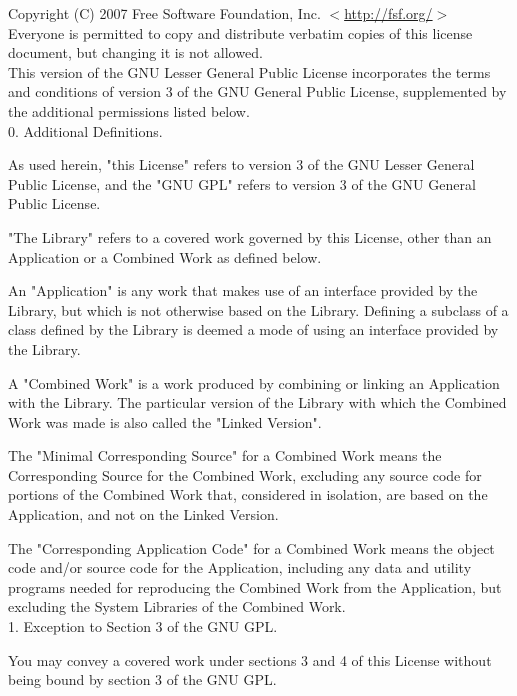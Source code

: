 \noindent Copyright (C) 2007 Free Software Foundation, Inc.  $<$\href{http://fsf.org/}{http://fsf.org/}$>$ \\

\noindent Everyone is permitted to copy and distribute verbatim copies
of this license document, but changing it is not allowed. \\


This version of the GNU Lesser General Public License incorporates
the terms and conditions of version 3 of the GNU General Public
License, supplemented by the additional permissions listed below. \\

0. Additional Definitions.

As used herein, "this License" refers to version 3 of the GNU Lesser
General Public License, and the "GNU GPL" refers to version 3 of the GNU
General Public License.

"The Library" refers to a covered work governed by this License,
other than an Application or a Combined Work as defined below.

An "Application" is any work that makes use of an interface provided
by the Library, but which is not otherwise based on the Library.
Defining a subclass of a class defined by the Library is deemed a mode
of using an interface provided by the Library.

A "Combined Work" is a work produced by combining or linking an
Application with the Library.  The particular version of the Library
with which the Combined Work was made is also called the "Linked
Version".

The "Minimal Corresponding Source" for a Combined Work means the
Corresponding Source for the Combined Work, excluding any source code
for portions of the Combined Work that, considered in isolation, are
based on the Application, and not on the Linked Version.

The "Corresponding Application Code" for a Combined Work means the
object code and/or source code for the Application, including any data
and utility programs needed for reproducing the Combined Work from the
Application, but excluding the System Libraries of the Combined Work. \\

1. Exception to Section 3 of the GNU GPL.

You may convey a covered work under sections 3 and 4 of this License
without being bound by section 3 of the GNU GPL. \\

